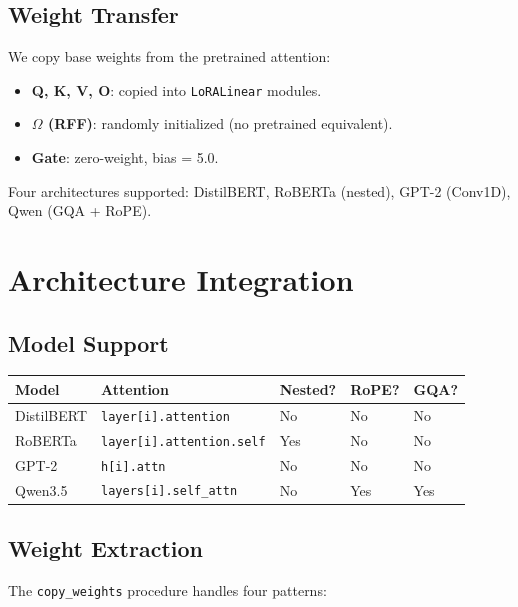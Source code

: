 \subsection{Weight Transfer}

We copy base weights from the pretrained attention:

\begin{itemize}
\item \textbf{Q, K, V, O}: copied into \texttt{LoRALinear} modules.
\item \textbf{$\Omega$ (RFF)}: randomly initialized (no pretrained equivalent).
\item \textbf{Gate}: zero-weight, bias = 5.0.

\end{itemize}
Four architectures supported: DistilBERT, RoBERTa (nested), GPT-2 (Conv1D), 
Qwen (GQA + RoPE).



\section{Architecture Integration}

\subsection{Model Support}

\begin{table}[H]
\centering
\small
\begin{tabular}{lllll}
\toprule
\textbf{Model} & \textbf{Attention} & \textbf{Nested?} & \textbf{RoPE?} & \textbf{GQA?} \\
\midrule
DistilBERT & \texttt{layer[i].attention} & No & No & No \\
RoBERTa & \texttt{layer[i].attention.self} & Yes & No & No \\
GPT-2 & \texttt{h[i].attn} & No & No & No \\
Qwen3.5 & \texttt{layers[i].self\_attn} & No & Yes & Yes \\
\bottomrule
\end{tabular}
\end{table}

\subsection{Weight Extraction}

The \texttt{copy\_weights} procedure handles four patterns:

